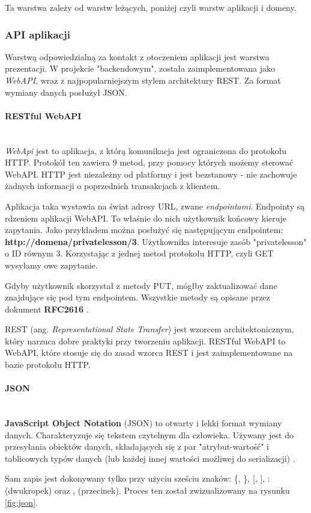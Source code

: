 \documentclass[12pt]{article}
\newcommand{\myparagraph}[1]{\paragraph{#1}\mbox{}\\}
\numberwithin{figure}{section}
\begin{document}
\begin{sloppypar}
    Ta warstwa zależy od warstw leżących, poniżej czyli warstw aplikacji i domeny.
        
    \subsubsection{API aplikacji}
    Warstwą odpowiedzialną za kontakt z otoczeniem aplikacji jest warstwa prezentacji. W projekcie "backendowym", została zaimplementowana jako \textit{WebAPI}, wraz z najpopularniejszym stylem architektury REST. Za format wymiany danych posłużył JSON.
        
        \myparagraph{RESTful WebAPI}
        \indent
        \textit{WebApi} jest to aplikacja, z którą komunikacja jest ograniczona do protokołu HTTP. Protokół ten zawiera 9 metod, przy pomocy których możemy sterować WebAPI. 
        HTTP jest niezależny od platformy i jest bezstanowy - nie zachowuje żadnych informacji o poprzednich transakcjach z klientem. 
        
        Aplikacja taka wystawia na świat adresy URL, zwane \textit{endpointami}.
        Endpointy są rdzeniem aplikacji WebAPI. To właśnie do nich użytkownik końcowy kieruje zapytania. Jako przykładem można posłużyć się następującym endpointem: \textbf{http://domena/privatelesson/3}. Użytkownika interesuje zasób "privatelesson" o ID równym 3. Korzystając z jednej metod protokołu HTTP, czyli GET wysyłamy owe zapytanie.
        
        Gdyby użytkownik skorzystał z metody PUT, mógłby zaktualizować dane znajdujące się pod tym endpointem. Wszystkie metody są opisane przez dokument \textbf{RFC2616} \cite{http}.
        
        REST (ang. \textit{Representational State Transfer}) jest wzorcem architektonicznym, który narzuca dobre praktyki przy tworzeniu aplikacji.
        RESTful WebAPI to WebAPI, które stosuje się do zasad wzorca REST i jest zaimplementowane na bazie protokołu HTTP.
        
        \myparagraph{JSON}
        \indent
        \textbf{JavaScript Object Notation} (JSON) to otwarty i lekki format wymiany danych. Charakteryzuje się tekstem czytelnym dla człowieka. Używany jest do przesyłania obiektów danych, składających się z par "atrybut-wartość" i tablicowych typów danych (lub każdej innej wartości możliwej do serializacji) \cite{json}.
        
        Sam zapis jest dokonywany tylko przy użyciu sześciu znaków: \{, \}, [, ], : (dwukropek) oraz , (przecinek). Proces ten został zwizualizowany na rysunku \ref{fig:json}.
        

\end{sloppypar}
\end{document}
